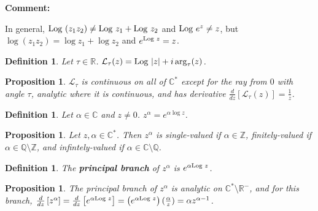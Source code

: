 \documentclass{article}
\theoremstyle{colontheorem}
\newtheorem{proposition}[theorem]{Proposition}
\newtheorem{definition}[theorem]{Definition}
\newcommand{\Log}{\textnormal{Log }}
\newenvironment{Proposition}
{
	\begin{mdframed}[backgroundcolor=TheoremOrange!10]
	\begin{proposition}
}
{
	\end{proposition}
	\end{mdframed}
	
	\vspace{.15in}
}
\newenvironment{Def}
{
	\begin{mdframed}[backgroundcolor=DefGreen!10]
	\begin{definition}
}
{
	\end{definition}
	\end{mdframed}
	
	\vspace{.15in}
}
\newenvironment{Comment}
{
	\begin{mdframed}[backgroundcolor=CommentBlue!10]
	\textbf{Comment:}%
}
{
	\end{mdframed}
	
	\vspace{.15in}
}
\begin{document}
\begin{Comment}
	In general, $\Log (z_1 z_2) \neq \Log z_1 + \Log z_2$ and $\Log e^z \neq z$, but $\log (z_1 z_2) = \log z_1 + \log z_2$ and $e^{\Log z} = z$.
	
\end{Comment}



\begin{Def}
	
	Let $\tau \in \mathbb{R}$. $\mathcal{L}_\tau (z) = \Log |z| + i \arg _\tau (z)$.
	
\end{Def}



\begin{Proposition}
	
	$\mathcal{L}_\tau$ is continuous on all of $\mathbb{C}^*$ except for the ray from $0$ with angle $\tau$, analytic where it is continuous, and has derivative $\frac{d}{dz} \left[ \mathcal{L}_\tau (z) \right] = \frac{1}{z}$.
	
\end{Proposition}



\begin{Def}
	
	Let $\alpha \in \mathbb{C}$ and $z \neq 0$. $z^\alpha = e^{\alpha \log z}$.
	
\end{Def}



\begin{Proposition}
	
	Let $z, \alpha \in \mathbb{C}^*$. Then $z^\alpha$ is single-valued if $\alpha \in \mathbb{Z}$, finitely-valued if $\alpha \in \mathbb{Q} \setminus \mathbb{Z}$, and infintely-valued if $\alpha \in \mathbb{C} \setminus \mathbb{Q}$.
	
\end{Proposition}



\begin{Def}
	
	The \textbf{principal branch} of $z^\alpha$ is $e^{\alpha \Log z}$.
	
\end{Def}



\begin{Proposition}
	
	The principal branch of $z^\alpha$ is analytic on $\mathbb{C}^* \setminus \mathbb{R}^-$, and for this branch, $\frac{d}{dz} \left[ z^\alpha \right] = \frac{d}{dz} \left[ e^{\alpha \Log z} \right] = \left( e^{\alpha \Log z} \right) (\frac{\alpha}{z}) = \alpha z^{\alpha - 1}$.
	
\end{Proposition}
\end{document}
